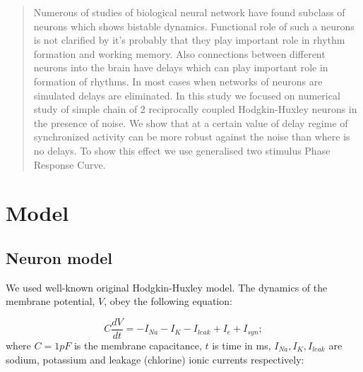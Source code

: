 \documentclass[aps,pre,twocolumn,groupedaddress]{revtex4-1}
\begin{document}
\begin{abstract}
Numerous of studies of biological neural network have found subclass of neurons which shows bistable dynamics. 
Functional role of such a neurons is not clarified by it's probably that they play important role in rhythm formation and working memory. Also connections between different neurons into the brain have delays which can play important role in formation of rhythms. In most cases when networks of neurons are simulated delays are eliminated. In this study we focused on numerical study of simple chain of 2 reciprocally coupled Hodgkin-Huxley neurons in the presence of noise. We show that at a certain value of delay regime of synchronized activity can be  more robust against the noise than where is no delays. To show this effect we use generalised two stimulus Phase Response Curve. 

\end{abstract}

\pacs{}

\maketitle

\section{Model}
\label{s:model}

\subsection*{Neuron model}
\label{ss:neuron}

We used well-known original Hodgkin-Huxley model. The dynamics of the membrane potential, $V$, obey the following equation:

\begin{equation}
	\label{eq:HH_main}
    C \frac{dV}{dt} = -I_{Na} - I_{K} - I_{leak} + I_{e} + I_{syn};
\end{equation} 
where $C = 1 pF$ is the membrane capacitance, $t$ is time in ms, $I_{Na}, I_{K}, I_{leak}$ are sodium, potassium and leakage (chlorine) ionic currents respectively:
\end{document}

